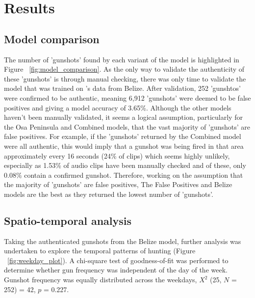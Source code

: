 
\chapter{Results} %

\label{Results} %


\section{Model comparison}

The number of 'gunshots' found by each variant of the model is highlighted in Figure ~\ref{fig:model_comparison}. As the only way to validate the authenticity of these 'gunshots' is through manual checking, there was only time to validate the model that was trained on \cite{Hill2018}'s data from Belize. After validation, 252 'gunshtos' were confirmed to be authentic, meaning 6,912 'gunshots' were deemed to be false positives and giving a model accuracy of 3.65\%. Although the other models haven't been manually validated, it seems a logical assumption, particularly for the Osa Peninsula and Combined models, that the vast majority of 'gunshots' are false positives. For example, if the 'gunshots' returned by the Combined model were all authentic, this would imply that a gunshot was being fired in that area approximately every 16 seconds (24\% of clips) which seems highly unlikely, especially as 1.53\% of audio clips have been manually checked and of these, only 0.08\% contain a confirmed gunshot. Therefore, working on the assumption that the majority of 'gunshots' are false positives, The False Positives and Belize models are the best as they returned the lowest number of 'gunshots'.


\section{Spatio-temporal analysis}

Taking the authenticated gunshots from the Belize model, further analysis was undertaken to explore the temporal patterns of hunting (Figure ~\ref{fig:weekday_plot}). A chi-square test of goodness-of-fit was performed to determine whether gun frequency was independent of the day of the week. Gunshot frequency was equally distributed across the weekdays, $X^2$ (25, $N$ = 252) = 42, $p$ = 0.227.\\

